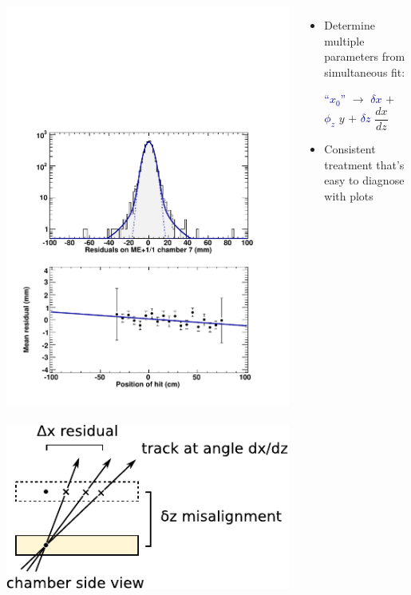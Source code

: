 \documentclass[compress]{beamer}
\begin{document}
\begin{frame}
\begin{columns}
\includegraphics[width=\linewidth]{phizfit_demo_MEp11_7.pdf}
\mbox{ } \hfill \includegraphics[width=0.8\linewidth]{zpos_diagram.pdf} \hfill \mbox{ }

\vspace{0.25 cm}
\begin{itemize}
\item Determine multiple parameters from simultaneous fit:

\textcolor{darkblue}{``$x_0$''} $\to$ \textcolor{darkblue}{$\delta x$} $+$ \textcolor{darkblue}{$\phi_z$} $y$ $+$ \textcolor{darkblue}{$\delta z$} $\dfrac{dx}{dz}$

\item Consistent treatment that's easy to diagnose with plots
\end{itemize}
\end{columns}
\end{frame}
\end{document}

